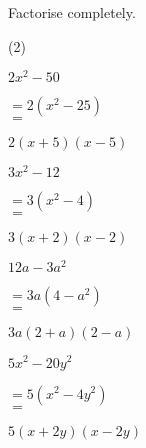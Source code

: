 
\noindent Factorise completely.
\begin{tasks}(2)
    \task \begin{exercise}$2x^2-50$
              \begin{envSolution}
                 $ =2(x^2-25)   $\\ 
                 $ =$			 
                     \begin{shortsolution}
  	                    $ 2(x+5)(x-5)$
                     \end{shortsolution}
              \end{envSolution}%
          \end{exercise}
 
    \task \begin{exercise}$3x^2-12$
              \begin{envSolution}
                 $ =3(x^2-4)   $\\ 
                 $ =$			 
                     \begin{shortsolution}
  	                    $ 3(x+2)(x-2)$
                     \end{shortsolution}
              \end{envSolution}%
          \end{exercise}
 
    \task \begin{exercise}$12a-3a^2$
              \begin{envSolution}
                 $ =3a(4-a^2)   $\\ 
                 $ =$			 
                     \begin{shortsolution}
  	                    $ 3a(2+a)(2-a)$
                     \end{shortsolution}
              \end{envSolution}%
          \end{exercise}

    \task \begin{exercise}$5x^2-20y^2$
              \begin{envSolution}
                 $ =5(x^2-4y^2)   $\\
                 $ =$			 
                     \begin{shortsolution}
  	                    $ 5(x+2y)(x-2y)$
                     \end{shortsolution}
              \end{envSolution}%
          \end{exercise}
 

\end{tasks}
